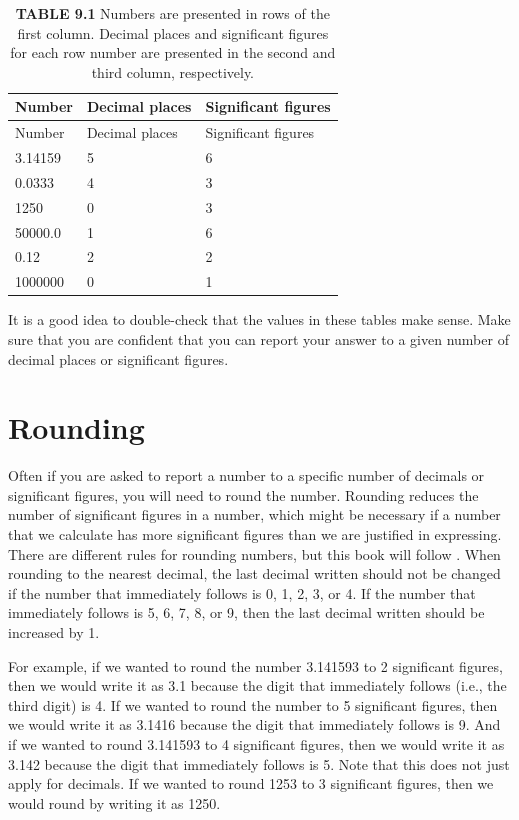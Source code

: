 \documentclass[
  openany]{krantz}
\begin{document}
\begin{longtable}[]{@{}lll@{}}
\caption{\textbf{TABLE 9.1} Numbers are presented in rows of the first column. Decimal places and significant figures for each row number are presented in the second and third column, respectively.}\tabularnewline
\toprule
Number & Decimal places & Significant figures \\
\midrule
\endfirsthead
\toprule
Number & Decimal places & Significant figures \\
\midrule
\endhead
3.14159 & 5 & 6 \\
0.0333 & 4 & 3 \\
1250 & 0 & 3 \\
50000.0 & 1 & 6 \\
0.12 & 2 & 2 \\
1000000 & 0 & 1 \\
\bottomrule
\end{longtable}

It is a good idea to double-check that the values in these tables make sense.
Make sure that you are confident that you can report your answer to a given number of decimal places or significant figures.

\hypertarget{rounding}{%
\section{Rounding}\label{rounding}}

Often if you are asked to report a number to a specific number of decimals or significant figures, you will need to round the number.
Rounding reduces the number of significant figures in a number, which might be necessary if a number that we calculate has more significant figures than we are justified in expressing.
There are different rules for rounding numbers, but this book will follow \citet{Sokal1995}.
When rounding to the nearest decimal, the last decimal written should not be changed if the number that immediately follows is 0, 1, 2, 3, or 4.
If the number that immediately follows is 5, 6, 7, 8, or 9, then the last decimal written should be increased by 1.

For example, if we wanted to round the number 3.141593 to 2 significant figures, then we would write it as 3.1 because the digit that immediately follows (i.e., the third digit) is 4.
If we wanted to round the number to 5 significant figures, then we would write it as 3.1416 because the digit that immediately follows is 9.
And if we wanted to round 3.141593 to 4 significant figures, then we would write it as 3.142 because the digit that immediately follows is 5.
Note that this does not just apply for decimals.
If we wanted to round 1253 to 3 significant figures, then we would round by writing it as 1250.
\end{document}
